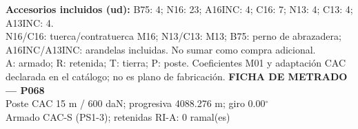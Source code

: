 \begingroup\scriptsize
\textbf{Accesorios incluidos (ud):} B75: 4; N16: 23; A16INC: 4; C16: 7; N13: 4; C13: 4; A13INC: 4.\\
N16/C16: tuerca/contratuerca M16; N13/C13: M13; B75: perno de abrazadera; A16INC/A13INC: arandelas incluidas. No sumar como compra adicional.\\
A: armado; R: retenida; T: tierra; P: poste. Coeficientes M01 y adaptación CAC declarada en el catálogo; no es plano de fabricación.
\endgroup\endgroup
\clearpage{}
\begingroup\small\setlength{\parskip}{3pt}\renewcommand{\arraystretch}{1.05}
\textbf{\large FICHA DE METRADO — P068}\\[4pt]
Poste CAC 15 m / 600 daN; progresiva 4088.276 m; giro 0.00\ensuremath{^\circ}\\
Armado CAC-S (PS1-3); retenidas RI-A: 0 ramal(es)\\
\begingroup\scriptsize
